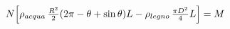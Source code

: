 \documentclass[preview]{standalone}
\begin{document}
\begin{align*}
N \Bigl[\rho_{acqua}\,\tfrac{R^2}{2}(2\pi-\theta+\sin\theta)L - \rho_{legno}\,\tfrac{\pi D^2}{4}L \Bigr] = M
\end{align*}
\end{document}
